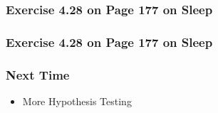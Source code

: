 \documentclass[handout]{beamer}
\newcommand{\blue}[1]{\textcolor{blue2}{#1}}
\newcommand{\xbar}{\overline{x}}
\begin{document}
\begin{frame}
\frametitle{Exercise 4.28 on Page 177 on Sleep}

%

\end{frame}


\begin{frame}
\frametitle{Exercise 4.28 on Page 177 on Sleep}

%
%
%

\end{frame}


\begin{frame}[fragile]
\frametitle{Next Time}

\begin{itemize}
\item More Hypothesis Testing
\end{itemize}

\end{frame}
\end{document}
